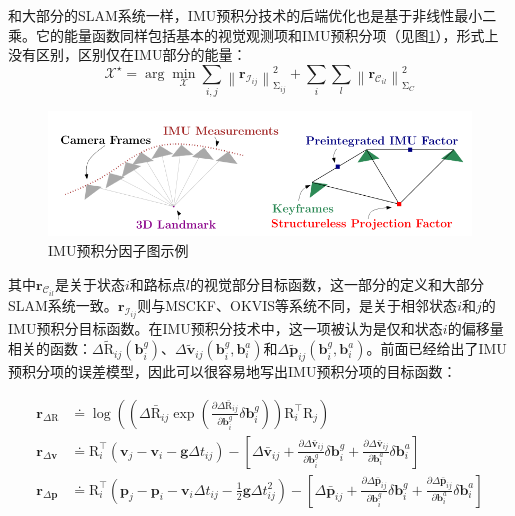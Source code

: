 和大部分的SLAM系统一样，IMU预积分技术的后端优化也是基于非线性最小二乘。它的能量函数同样包括基本的视觉观测项和IMU预积分项（见图\ref{fig:preint}），形式上没有区别，区别仅在IMU部分的能量：
\begin{equation}\label{eq:gtsam_res}
    \bm{\mathcal X}^\star =
        \arg\mathop{\min}_{\bm{\mathcal X}}
        \sum_{i,j}\left\| \bm{r}_{\mathcal{I}_{ij}} \right\|^2_{\mathrm\Sigma_{ij}} +
        \sum_{i} \sum_{l} \left\| \bm{r}_{\mathcal{C}_{il}} \right\|^2_{\mathrm\Sigma_{C}}
\end{equation}

\begin{figure}[htb!]
    \centering
    \includegraphics[width=.6\textwidth]{./figs/preint.png}
    \caption{IMU预积分因子图示例\citep{forster2017manifold}}
    \label{fig:preint}
\end{figure}

其中$\bm{r}_{\mathcal{C}_{il}}$是关于状态$i$和路标点$l$的视觉部分目标函数，这一部分的定义和大部分SLAM系统一致。$\bm{r}_{\mathcal{I}_{ij}}$则与MSCKF、OKVIS等系统不同，是关于相邻状态$i$和$j$的IMU预积分目标函数。在IMU预积分技术中，这一项被认为是仅和状态$i$的偏移量相关的函数：$\Delta\tilde{\mathrm R}_{ij}(\bm{b}^g_i)$、$\Delta\tilde{\bm v}_{ij}(\bm{b}^g_i, \bm{b}^a_i)$和$\Delta\tilde{\bm p}_{ij}(\bm{b}^g_i, \bm{b}^a_i)$。前面已经给出了IMU预积分项的误差模型，因此可以很容易地写出IMU预积分项的目标函数：

\begin{equation}
\begin{aligned}
  \bm{r}_{\Delta\mathrm{R}}
    &\doteq
      \log\left(
        \left(
          \Delta\bar{\mathrm R}_{ij}
          \exp\left(
            \tfrac{\partial\Delta\bar{\mathrm R}_{ij}}{\partial\bm{b}^g_i}
            \delta\bm{b}^g_i\right)
        \right) \mathrm{R}^\top_i \mathrm{R}_j
      \right) \\
  \bm{r}_{\Delta\bm{v}}
    &\doteq
      \mathrm{R}^\top_i(\bm{v}_j - \bm{v}_i - \bm{g}\Delta t_{ij}) -
      \left[
        \Delta\bar{\bm v}_{ij} +
        \tfrac{\partial\Delta\bar{\bm v}_{ij}}{\partial\bm{b}^g_i}
        \delta\bm{b}^g_i +
        \tfrac{\partial\Delta\bar{\bm v}_{ij}}{\partial\bm{b}^a_i}
        \delta\bm{b}^a_i
      \right] \\
  \bm{r}_{\Delta\bm{p}}
    &\doteq
      \mathrm{R}^\top_i(
        \bm{p}_j - \bm{p}_i -
        \bm{v}_i \Delta t_{ij} -
        \tfrac{1}{2}\bm{g}\Delta t^2_{ij}) -
      \left[
        \Delta\bar{\bm p}_{ij} +
        \tfrac{\partial\Delta\bar{\bm p}_{ij}}{\partial\bm{b}^g_i}
        \delta\bm{b}^g_i +
        \tfrac{\partial\Delta\bar{\bm p}_{ij}}{\partial\bm{b}^a_i}
        \delta\bm{b}^a_i \right]
\end{aligned}
\end{equation}
